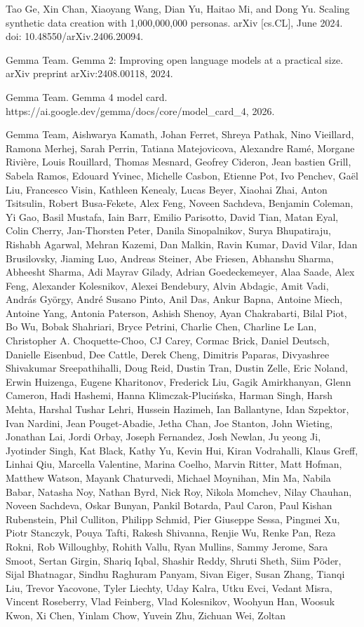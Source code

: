 \documentclass[
  10
]{article}
\begin{document}
Tao Ge, Xin Chan, Xiaoyang Wang, Dian Yu, Haitao Mi, and Dong Yu.
Scaling synthetic data creation with 1,000,000,000 personas. arXiv
{[}cs.CL{]}, June 2024. doi: 10.48550/arXiv.2406.20094.

Gemma Team. Gemma 2: Improving open language models at a practical size.
arXiv preprint arXiv:2408.00118, 2024.

Gemma Team. Gemma 4 model card.
https://ai.google.dev/gemma/docs/core/model\_card\_4, 2026.

Gemma Team, Aishwarya Kamath, Johan Ferret, Shreya Pathak, Nino
Vieillard, Ramona Merhej, Sarah Perrin, Tatiana Matejovicova, Alexandre
Ramé, Morgane Rivière, Louis Rouillard, Thomas Mesnard, Geofrey Cideron,
Jean bastien Grill, Sabela Ramos, Edouard Yvinec, Michelle Casbon,
Etienne Pot, Ivo Penchev, Gaël Liu, Francesco Visin, Kathleen Kenealy,
Lucas Beyer, Xiaohai Zhai, Anton Tsitsulin, Robert Busa-Fekete, Alex
Feng, Noveen Sachdeva, Benjamin Coleman, Yi Gao, Basil Mustafa, Iain
Barr, Emilio Parisotto, David Tian, Matan Eyal, Colin Cherry,
Jan-Thorsten Peter, Danila Sinopalnikov, Surya Bhupatiraju, Rishabh
Agarwal, Mehran Kazemi, Dan Malkin, Ravin Kumar, David Vilar, Idan
Brusilovsky, Jiaming Luo, Andreas Steiner, Abe Friesen, Abhanshu Sharma,
Abheesht Sharma, Adi Mayrav Gilady, Adrian Goedeckemeyer, Alaa Saade,
Alex Feng, Alexander Kolesnikov, Alexei Bendebury, Alvin Abdagic, Amit
Vadi, András György, André Susano Pinto, Anil Das, Ankur Bapna, Antoine
Miech, Antoine Yang, Antonia Paterson, Ashish Shenoy, Ayan Chakrabarti,
Bilal Piot, Bo Wu, Bobak Shahriari, Bryce Petrini, Charlie Chen,
Charline Le Lan, Christopher A. Choquette-Choo, CJ Carey, Cormac Brick,
Daniel Deutsch, Danielle Eisenbud, Dee Cattle, Derek Cheng, Dimitris
Paparas, Divyashree Shivakumar Sreepathihalli, Doug Reid, Dustin Tran,
Dustin Zelle, Eric Noland, Erwin Huizenga, Eugene Kharitonov, Frederick
Liu, Gagik Amirkhanyan, Glenn Cameron, Hadi Hashemi, Hanna
Klimczak-Plucińska, Harman Singh, Harsh Mehta, Harshal Tushar Lehri,
Hussein Hazimeh, Ian Ballantyne, Idan Szpektor, Ivan Nardini, Jean
Pouget-Abadie, Jetha Chan, Joe Stanton, John Wieting, Jonathan Lai,
Jordi Orbay, Joseph Fernandez, Josh Newlan, Ju yeong Ji, Jyotinder
Singh, Kat Black, Kathy Yu, Kevin Hui, Kiran Vodrahalli, Klaus Greff,
Linhai Qiu, Marcella Valentine, Marina Coelho, Marvin Ritter, Matt
Hofman, Matthew Watson, Mayank Chaturvedi, Michael Moynihan, Min Ma,
Nabila Babar, Natasha Noy, Nathan Byrd, Nick Roy, Nikola Momchev, Nilay
Chauhan, Noveen Sachdeva, Oskar Bunyan, Pankil Botarda, Paul Caron, Paul
Kishan Rubenstein, Phil Culliton, Philipp Schmid, Pier Giuseppe Sessa,
Pingmei Xu, Piotr Stanczyk, Pouya Tafti, Rakesh Shivanna, Renjie Wu,
Renke Pan, Reza Rokni, Rob Willoughby, Rohith Vallu, Ryan Mullins, Sammy
Jerome, Sara Smoot, Sertan Girgin, Shariq Iqbal, Shashir Reddy, Shruti
Sheth, Siim Põder, Sijal Bhatnagar, Sindhu Raghuram Panyam, Sivan Eiger,
Susan Zhang, Tianqi Liu, Trevor Yacovone, Tyler Liechty, Uday Kalra,
Utku Evci, Vedant Misra, Vincent Roseberry, Vlad Feinberg, Vlad
Kolesnikov, Woohyun Han, Woosuk Kwon, Xi Chen, Yinlam Chow, Yuvein Zhu,
Zichuan Wei, Zoltan
\end{document}
